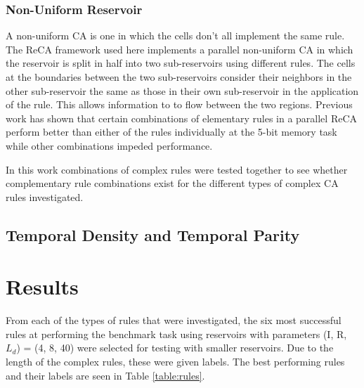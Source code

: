 \documentclass{elsarticle}
\begin{document}
\begin{multicols}{2}
\subsubsection{Non-Uniform Reservoir}
A non-uniform CA is one in which the cells don't all implement the same rule.  
    The ReCA framework used here implements a parallel non-uniform CA in which 
    the reservoir is split in half into two sub-reservoirs  using different 
    rules.  The cells at the boundaries between  the two sub-reservoirs 
    consider their neighbors in the other sub-reservoir the same as those in 
    their own sub-reservoir in the application of the rule. This allows 
    information to to flow between the two regions. Previous work has shown 
    that certain combinations of elementary rules in a parallel ReCA perform 
    better than either of the rules individually at the 5-bit memory task while 
    other combinations impeded performance\cite{nichele2017reservoir}.  \par In 
    this work combinations of complex rules were tested together to see whether 
    complementary rule combinations exist for the different types of complex CA 
    rules investigated.  
    
\subsection{Temporal Density and Temporal Parity}

\section{Results}\label{results}
From each of the types of rules that were investigated, the six most successful 
rules at performing the benchmark task using reservoirs with parameters (I, R, 
        $L_{d}$) = (4, 8, 40) were selected for testing with smaller  
reservoirs. Due to the length of the complex rules, these were given labels.  
The best performing rules and their labels are seen in Table
\ref{table:rules}. \par


\end{multicols}
\end{document}

